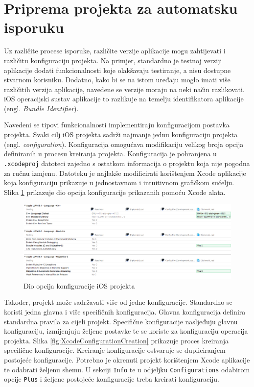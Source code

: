 \documentclass[times, utf8, diplomski, numeric]{fer}
\newcommand{\eng}[1]{(engl. \textit{#1})}
\begin{document}
\section{Priprema projekta za automatsku isporuku}

Uz različite procese isporuke, različite verzije aplikacije mogu zahtijevati i različitu konfiguraciju projekta. Na primjer, standardno je testnoj verziji aplikacije dodati funkcionalnosti koje olakšavaju testiranje, a nisu dostupne stvarnom korisniku. Dodatno, kako bi se na istom uređaju moglo imati više različitih verzija aplikacije, navedene se verzije moraju na neki način razlikovati. iOS operacijski sustav aplikacije to razlikuje na temelju identifikatora aplikacije \eng{Bundle Identifier}.

Navedeni se tipovi funkcionalnosti implementiraju konfiguracijom postavka projekta. Svaki cilj iOS projekta sadrži najmanje jednu konfiguraciju projekta \eng{configuration}. Konfiguracija omogućava modifikaciju velikog broja opcija definiranih u procesu kreiranja projekta. Konfiguracija je pohranjena u \verb|.xcodeproj| datoteci zajedno s ostatkom informacija o projektu koja nije pogodna za ručnu izmjenu. Datoteku je najlakše modificirati korištenjem Xcode aplikacije koja konfiguraciju prikazuje u jednostavnom i intuitivnom grafičkom sučelju. Slika \ref{fig:XcodeConfiguration} prikazuje dio opcija konfiguracije prikazanih pomoću Xcode alata.

\begin{figure}
\centering
\includegraphics[scale=0.37]{XcodeConfiguration}
\caption{Dio opcija konfiguracije iOS projekta}
\label{fig:XcodeConfiguration}
\end{figure}

Također, projekt može sadržavati više od jedne konfiguracije. Standardno se koristi jedna glavna i više specifičnih konfiguracija. Glavna konfiguracija definira standardna pravila za cijeli projekt. Specifične konfiguracije nasljeđuju glavnu konfiguraciju, izmijenjuju željene postavke te se koriste za konfiguraciju operacija projekta. Slika \ref{fig:XcodeConfigurationCreation} prikazuje proces kreiranja specifične konfiguracije. Kreiranje konfiguracije ostvaruje se dupliciranjem postojeće konfiguracije. Potrebno je okrenuti projekt korištenjem Xcode aplikacije te odabrati željenu shemu. U sekciji \verb|Info| te u odjeljku \verb|Configurations| odabirom opcije \verb|Plus| i željene postojeće konfiguracije treba kreirati konfiguraciju.
\end{document}
